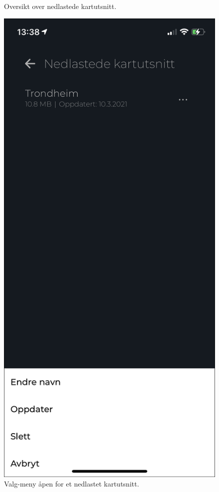 \begin{figure}[H]
\begin{minipage}[b]{0.4\textwidth}
    \caption{Oversikt over nedlastede kartutsnitt.}
    \label{fig:nedlastede-kartutsnitt}
  \end{minipage}
  \hfill
  \begin{minipage}[b]{0.4\textwidth}
    \centering
    \includegraphics[scale=0.4]{Figurer/skjermbilder/nedlastede-kartutsnitt-apen-meny.png}
    \caption{Valg-meny åpen for et nedlastet kartutsnitt.}
    \label{fig:nedlastede-kartutsnitt-apen-meny}
  \end{minipage}
\end{figure}

